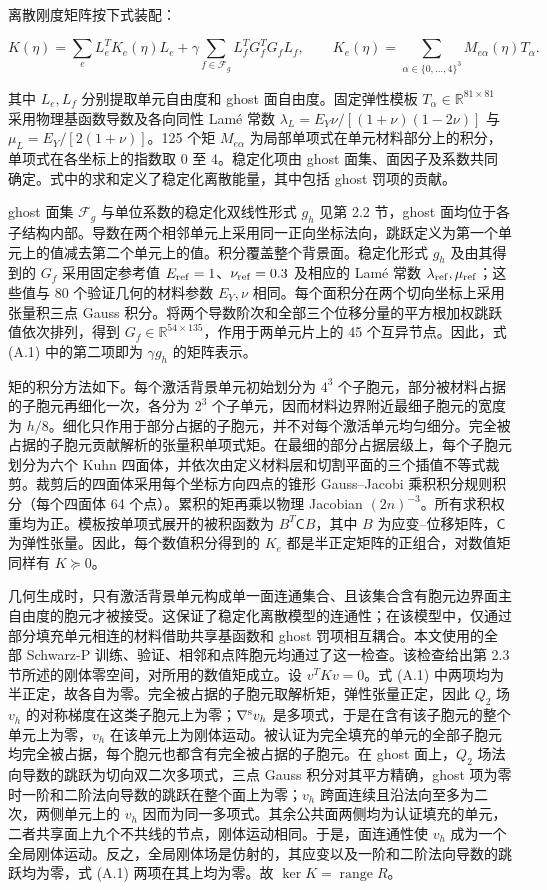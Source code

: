 \documentclass[preprint,12pt,authoryear]{elsarticle}
\begin{document}
离散刚度矩阵按下式装配：

\[
K(\eta)=\sum_e L_e^TK_e(\eta)L_e
 +\gamma\sum_{f\in\mathcal F_g}L_f^TG_f^TG_fL_f,
\qquad
K_e(\eta)=\sum_{\alpha\in\{0,\ldots,4\}^3}M_{e\alpha}(\eta)T_\alpha.
\tag{A.1}
\]

其中 \(L_e,L_f\) 分别提取单元自由度和 ghost 面自由度。固定弹性模板 \(T_\alpha\in\mathbb R^{81\times81}\) 采用物理基函数导数及各向同性 Lamé 常数 \(\lambda_L=E_Y\nu/[(1+\nu)(1-2\nu)]\) 与 \(\mu_L=E_Y/[2(1+\nu)]\)。125 个矩 \(M_{e\alpha}\) 为局部单项式在单元材料部分上的积分，单项式在各坐标上的指数取 0 至 4。稳定化项由 ghost 面集、面因子及系数共同确定。式中的求和定义了稳定化离散能量，其中包括 ghost 罚项的贡献。

ghost 面集 \(\mathcal F_g\) 与单位系数的稳定化双线性形式 \(g_h\) 见第 2.2 节，ghost 面均位于各子结构内部。导数在两个相邻单元上采用同一正向坐标法向，跳跃定义为第一个单元上的值减去第二个单元上的值。积分覆盖整个背景面。稳定化形式 \(g_h\) 及由其得到的 \(G_f\) 采用固定参考值 \(E_{\rm ref}=1\)、\(\nu_{\rm ref}=0.3\) 及相应的 Lamé 常数 \(\lambda_{\rm ref},\mu_{\rm ref}\)；这些值与 80 个验证几何的材料参数 \(E_Y,\nu\) 相同。每个面积分在两个切向坐标上采用张量积三点 Gauss 积分。将两个导数阶次和全部三个位移分量的平方根加权跳跃值依次排列，得到 \(G_f\in\mathbb R^{54\times135}\)，作用于两单元片上的 45 个互异节点。因此，式 (A.1) 中的第二项即为 \(\gamma g_h\) 的矩阵表示。

矩的积分方法如下。每个激活背景单元初始划分为 \(4^3\) 个子胞元，部分被材料占据的子胞元再细化一次，各分为 \(2^3\) 个子单元，因而材料边界附近最细子胞元的宽度为 \(h/8\)。细化只作用于部分占据的子胞元，并不对每个激活单元均匀细分。完全被占据的子胞元贡献解析的张量积单项式矩。在最细的部分占据层级上，每个子胞元划分为六个 Kuhn 四面体，并依次由定义材料层和切割平面的三个插值不等式裁剪。裁剪后的四面体采用每个坐标方向四点的锥形 Gauss--Jacobi 乘积积分规则积分（每个四面体 64 个点）。累积的矩再乘以物理 Jacobian \((2n)^{-3}\)。所有求积权重均为正。模板按单项式展开的被积函数为 \(B^T\mathsf CB\)，其中 \(B\) 为应变--位移矩阵，\(\mathsf C\) 为弹性张量。因此，每个数值积分得到的 \(K_e\) 都是半正定矩阵的正组合，对数值矩同样有 \(K\succeq0\)。

几何生成时，只有激活背景单元构成单一面连通集合、且该集合含有胞元边界面主自由度的胞元才被接受。这保证了稳定化离散模型的连通性；在该模型中，仅通过部分填充单元相连的材料借助共享基函数和 ghost 罚项相互耦合。本文使用的全部 Schwarz-P 训练、验证、相邻和点阵胞元均通过了这一检查。该检查给出第 2.3 节所述的刚体零空间，对所用的数值矩成立。设 \(v^TKv=0\)。式 (A.1) 中两项均为半正定，故各自为零。完全被占据的子胞元取解析矩，弹性张量正定，因此 \(Q_2\) 场 \(v_h\) 的对称梯度在这类子胞元上为零；\(\nabla^{\rm s}v_h\) 是多项式，于是在含有该子胞元的整个单元上为零，\(v_h\) 在该单元上为刚体运动。被认证为完全填充的单元的全部子胞元均完全被占据，每个胞元也都含有完全被占据的子胞元。在 ghost 面上，\(Q_2\) 场法向导数的跳跃为切向双二次多项式，三点 Gauss 积分对其平方精确，ghost 项为零时一阶和二阶法向导数的跳跃在整个面上为零；\(v_h\) 跨面连续且沿法向至多为二次，两侧单元上的 \(v_h\) 因而为同一多项式。其余公共面两侧均为认证填充的单元，二者共享面上九个不共线的节点，刚体运动相同。于是，面连通性使 \(v_h\) 成为一个全局刚体运动。反之，全局刚体场是仿射的，其应变以及一阶和二阶法向导数的跳跃均为零，式 (A.1) 两项在其上均为零。故 \(\ker K=\operatorname{range}R\)。
\end{document}
